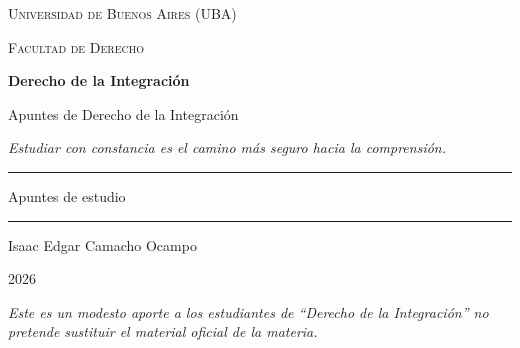 \documentclass[12pt,oneside]{book}
\newcommand{\universidad}{Universidad de Buenos Aires (UBA)}
\newcommand{\facultad}{Facultad de Derecho}
\newcommand{\materia}{Derecho de la Integración}
\newcommand{\titulo}{Apuntes de Derecho de la Integración}
\newcommand{\autor}{Isaac Edgar Camacho Ocampo}
\newcommand{\anio}{2026}
\begin{document}
\begin{titlepage}

\thispagestyle{empty}

\begin{center}

\vspace*{1cm}

{\large \textsc{\universidad}}

\vspace{0.2cm}

{\large \textsc{\facultad}}

\vspace{3cm}

{\Huge \textbf{\materia}}

\vspace{1cm}

{\LARGE \titulo}

\vspace{0.8cm}

\textit{Estudiar con constancia es el camino más seguro hacia la comprensión.}

\vspace{1.2cm}

\rule{0.70\textwidth}{0.5pt}

\vspace{0.5cm}

{\large Apuntes de estudio}

\vspace{0.5cm}

\rule{0.70\textwidth}{0.5pt}

\vfill

{\large \autor}

\vspace{0.3cm}

{\large \anio}

\end{center}

\vfill

\begin{flushleft}
\textit{Este es un modesto aporte a los estudiantes de ``\materia'' no pretende sustituir el material oficial de la materia.}
\end{flushleft}

\end{titlepage}

\tableofcontents
\end{document}
